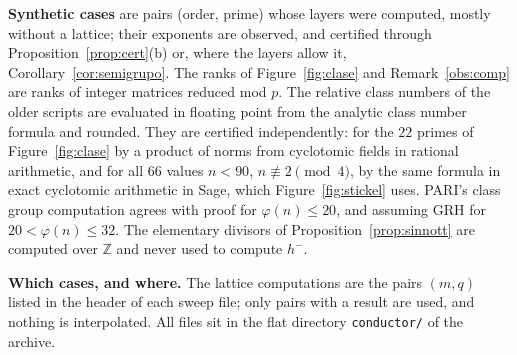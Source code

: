 \documentclass[11pt,a4paper]{article}
\theoremstyle{definition}
\newcommand{\ZZ}{\mathbb{Z}}
\begin{document}
\noindent\textbf{Synthetic cases} are pairs (order, prime) whose layers were computed, mostly without a lattice; their
exponents are observed, and certified through Proposition~\ref{prop:cert}(b) or, where the layers allow it,
Corollary~\ref{cor:semigrupo}. The ranks of Figure~\ref{fig:clase} and
Remark~\ref{obs:comp} are ranks of integer matrices reduced mod $p$. The relative class numbers of the older scripts are
evaluated in floating point from the analytic class number formula and rounded. They are certified independently:
for the $22$ primes of Figure~\ref{fig:clase} by a product of norms from cyclotomic fields in rational arithmetic, and
for all $66$ values $n<90$, $n\not\equiv2\pmod4$, by the same formula in exact cyclotomic arithmetic in Sage, which
Figure~\ref{fig:stickel} uses. PARI's class group computation agrees with proof for $\varphi(n)\le20$, and assuming GRH
for $20<\varphi(n)\le32$. The elementary divisors of Proposition~\ref{prop:sinnott} are computed over $\ZZ$ and never
used to compute $h^-$.

\noindent\textbf{Which cases, and where.} The lattice computations are the pairs $(m,q)$ listed in the header of each
sweep file; only pairs with a result are used, and nothing is interpolated. All files sit in the flat directory \texttt{conductor/} of the archive.
\end{document}
